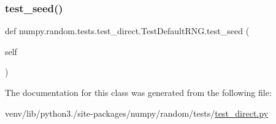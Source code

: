 \mbox{\label{classnumpy_1_1random_1_1tests_1_1test__direct_1_1TestDefaultRNG_a10ed9f8dded4ff7c04625fd748ce0f61}} 
\subsubsection{\texorpdfstring{test\+\_\+seed()}{test\_seed()}}
{\footnotesize\ttfamily def numpy.\+random.\+tests.\+test\+\_\+direct.\+Test\+Default\+R\+N\+G.\+test\+\_\+seed (\begin{DoxyParamCaption}\item[{}]{self }\end{DoxyParamCaption})}



The documentation for this class was generated from the following file\+:\begin{DoxyCompactItemize}
\item 
venv/lib/python3./site-\/packages/numpy/random/tests/\hyperlink{test__direct_8py}{test\+\_\+direct.\+py}\end{DoxyCompactItemize}
